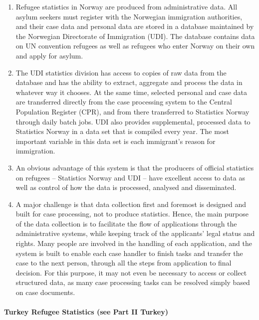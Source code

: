 \documentclass[
]{article}
\begin{document}
\begin{enumerate}
\def\labelenumi{\arabic{enumi}.}
\setcounter{enumi}{162}
\item
  Refugee statistics in Norway are produced from administrative data.
  All asylum seekers must register with the Norwegian immigration
  authorities, and their case data and personal data are stored in a
  database maintained by the Norwegian Directorate of Immigration
  (UDI). The database contains data on UN convention refugees as well
  as refugees who enter Norway on their own and apply for asylum.
\item
  The UDI statistics division has access to copies of raw data from
  the database and has the ability to extract, aggregate and process
  the data in whatever way it chooses. At the same time, selected
  personal and case data are transferred directly from the case
  processing system to the Central Population Register (CPR), and from
  there transferred to Statistics Norway through daily batch jobs. UDI
  also provides supplemental, processed data to Statistics Norway in a
  data set that is compiled every year. The most important variable in
  this data set is each immigrant's reason for immigration.
\item
  An obvious {advantage} of this system is that the
  producers of official statistics on refugees -- Statistics Norway
  and UDI -- have excellent access to data as well as control of how
  the data is processed, analysed and disseminated.
\item
  A major {challenge} is that data collection first and
  foremost is designed and built for case processing, not to produce
  statistics. Hence, the main purpose of the data collection is to
  facilitate the flow of applications through the administrative
  systems, while keeping track of the applicants' legal status and
  rights. Many people are involved in the handling of each
  application, and the system is built to enable each case handler to
  finish tasks and transfer the case to the next person, through all
  the steps from application to final decision. For this purpose, it
  may not even be necessary to access or collect structured data, as
  many case processing tasks can be resolved simply based on case
  documents.
\end{enumerate}

\hypertarget{turkey-refugee-statistics-see-part-ii-turkey}{%
\paragraph{Turkey Refugee Statistics (see Part II Turkey)}\label{turkey-refugee-statistics-see-part-ii-turkey}}
\end{document}
